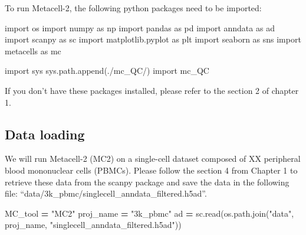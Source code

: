 \documentclass[
]{book}
\newenvironment{Shaded}{\begin{snugshade}}{\end{snugshade}}
\newcommand{\ImportTok}[1]{#1}
\newcommand{\NormalTok}[1]{#1}
\newcommand{\OperatorTok}[1]{\textcolor[rgb]{0.81,0.36,0.00}{\textbf{#1}}}
\newcommand{\StringTok}[1]{\textcolor[rgb]{0.31,0.60,0.02}{#1}}
\begin{document}
To run Metacell-2, the following python packages need to be imported:

\begin{Shaded}
\begin{Highlighting}[]
\ImportTok{import}\NormalTok{ os}
\ImportTok{import}\NormalTok{ numpy }\ImportTok{as}\NormalTok{ np}
\ImportTok{import}\NormalTok{ pandas }\ImportTok{as}\NormalTok{ pd}
\ImportTok{import}\NormalTok{ anndata }\ImportTok{as}\NormalTok{ ad}
\ImportTok{import}\NormalTok{ scanpy }\ImportTok{as}\NormalTok{ sc}
\ImportTok{import}\NormalTok{ matplotlib.pyplot }\ImportTok{as}\NormalTok{ plt}
\ImportTok{import}\NormalTok{ seaborn }\ImportTok{as}\NormalTok{ sns}
\ImportTok{import}\NormalTok{ metacells }\ImportTok{as}\NormalTok{ mc}
\end{Highlighting}
\end{Shaded}

\begin{Shaded}
\begin{Highlighting}[]
\ImportTok{import}\NormalTok{ sys}
\NormalTok{sys.path.append(}\StringTok{\textquotesingle{}./mc\_QC/\textquotesingle{}}\NormalTok{)}
\ImportTok{import}\NormalTok{ mc\_QC}
\end{Highlighting}
\end{Shaded}

If you don't have these packages installed, please refer to the section 2 of chapter 1.

\hypertarget{data-loading}{%
\subsection{Data loading}\label{data-loading}}

We will run Metacell-2 (MC2) on a single-cell dataset composed of XX peripheral blood mononuclear cells (PBMCs). Please follow the section 4 from Chapter 1 to retrieve these data from the scanpy package and save the data in the following file: ``data/3k\_pbmc/singlecell\_anndata\_filtered.h5ad''.

\begin{Shaded}
\begin{Highlighting}[]
\NormalTok{MC\_tool }\OperatorTok{=} \StringTok{"MC2"}
\NormalTok{proj\_name }\OperatorTok{=} \StringTok{"3k\_pbmc"}
\NormalTok{ad }\OperatorTok{=}\NormalTok{ sc.read(os.path.join(}\StringTok{"data"}\NormalTok{, proj\_name, }\StringTok{"singlecell\_anndata\_filtered.h5ad"}\NormalTok{))}
\end{Highlighting}
\end{Shaded}
\end{document}
